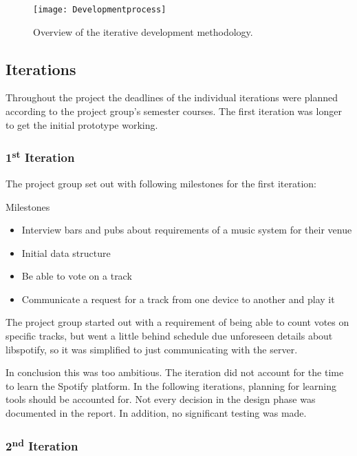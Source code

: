 \begin{figure}[hbtp]
  \centering
  \texttt{[image: Developmentprocess]}
  \caption{Overview of the iterative development methodology.}\label{fig:developmentprocess}
\end{figure}

\subsection{Iterations}

Throughout the project the deadlines of the individual iterations were planned according to the project group's semester courses. The first iteration was longer to get the initial prototype working.

\subsubsection{1\textsuperscript{st} Iteration}

The project group set out with following milestones for the first iteration:

Milestones
\begin{itemize}
        \item Interview bars and pubs about requirements of a music system for their venue
        \item Initial data structure
        \item Be able to vote on a track
        \item Communicate a request for a track from one device to another and play it
\end{itemize}

The project group started out with a requirement of being able to count votes on specific tracks, but went a little behind schedule due unforeseen details about libspotify, so it was simplified to just communicating with the server.

In conclusion this was too ambitious. The iteration did not account
for the time to learn the Spotify platform. In the following iterations, planning for learning tools should be accounted for. Not every decision in the design phase was documented in the report. In addition, no significant testing was made.

\subsubsection{2\textsuperscript{nd} Iteration}

